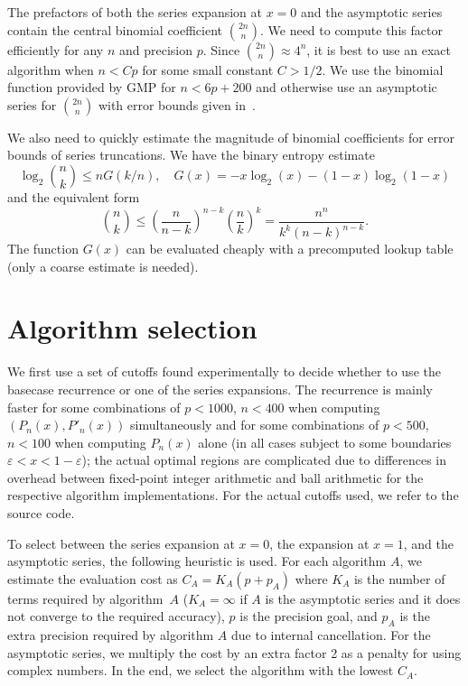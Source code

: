\documentclass{siamart0216}
\begin{document}
The prefactors of both the series expansion at $x = 0$ and the asymptotic series
contain the central binomial coefficient ${2n \choose n}$.
We need to compute this factor efficiently for any $n$ and precision $p$.
Since ${2n \choose n} \approx 4^n$, it is best to use
an exact algorithm when $n < Cp$ for some small constant $C > 1/2$.
We use the binomial function provided by GMP for $n < 6p + 200$
and otherwise use an asymptotic series for ${2n \choose n}$
with error bounds given in~\cite{brent2016asymptotic}.

We also need to quickly estimate the magnitude of binomial coefficients
for error bounds of series truncations.
We have the binary entropy estimate
$$\log_2 {n \choose k} \le n G(k/n), \quad G(x) = -x \log_2(x) - (1-x) \log_2(1-x)$$
and the equivalent form
\begin{equation}
\label{eq:binbound}
{n \choose k} \le \left(\frac{n}{n-k}\right)^{n-k} \left(\frac{n}{k}\right)^k = \frac{n^n}{k^k (n-k)^{n-k}}.
\end{equation}
The function $G(x)$ can be evaluated cheaply with a precomputed
lookup table (only a coarse estimate is needed).

\section{Algorithm selection}

\label{sec:selection}

We first use a set of cutoffs found experimentally to decide whether to use the basecase recurrence or one of the series expansions. The recurrence is mainly faster for some combinations of $p < 1000$, $n < 400$ when computing $(P_n(x), P'_n(x))$ simultaneously and for some combinations of $p < 500$, $n < 100$ when computing $P_n(x)$ alone (in all cases subject to some boundaries $\varepsilon < x < 1 - \varepsilon$); the actual optimal regions are complicated due to differences in overhead between fixed-point integer arithmetic and ball arithmetic for the respective algorithm implementations. For the actual cutoffs used, we refer to the source code.

To select between the series expansion at $x = 0$, the expansion at $x = 1$, and the asymptotic series, the following heuristic is used. For each algorithm $A$, we estimate the evaluation cost as $C_A = K_A (p + p_A)$ where $K_A$ is the number of terms required by algorithm~$A$ ($K_A = \infty$ if $A$ is the asymptotic series and it does not converge to the required accuracy), $p$ is the precision goal, and $p_A$ is the extra precision required by algorithm $A$ due to internal cancellation. For the asymptotic series, we multiply the cost by an extra factor 2 as a penalty for using complex numbers. In the end, we select the algorithm with the lowest $C_A$.
\end{document}
